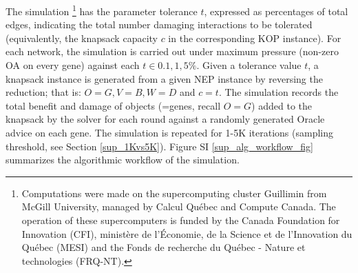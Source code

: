 			The simulation
			\footnote{\scriptsize{Computations were made on the supercomputing cluster Guillimin from McGill University, managed by Calcul Québec and Compute Canada. The operation of these supercomputers is funded by the Canada Foundation for Innovation (CFI), ministère de l’Économie, de la Science et de l’Innovation du Québec (MESI) and the Fonds de recherche du Québec - Nature et technologies (FRQ-NT).}}
            has the parameter tolerance $t$, expressed as percentages of total edges,  indicating the total number damaging interactions to
			be tolerated (equivalently, the knapsack capacity $c$ in the
			corresponding KOP instance).
			For each network, the simulation is carried out under maximum pressure (non-zero OA on every gene)
			against each $t \in {0.1, 1, 5}\%$.
			Given a tolerance value $t$, a knapsack instance is generated from a given NEP instance by reversing the reduction;
			that is: $O=G, V=B, W=D$ and $c=t$. The simulation records the total benefit and damage of objects (=genes, recall $O=G$)
			added to the knapsack by the solver  \cite{pisinger_where_2005} for each round against a randomly generated Oracle advice on each gene.
			The simulation is repeated for 1-5K iterations (sampling threshold, see Section \ref{sup_1Kvs5K}). Figure SI \ref{sup_alg_workflow_fig} summarizes the algorithmic workflow of the simulation.


